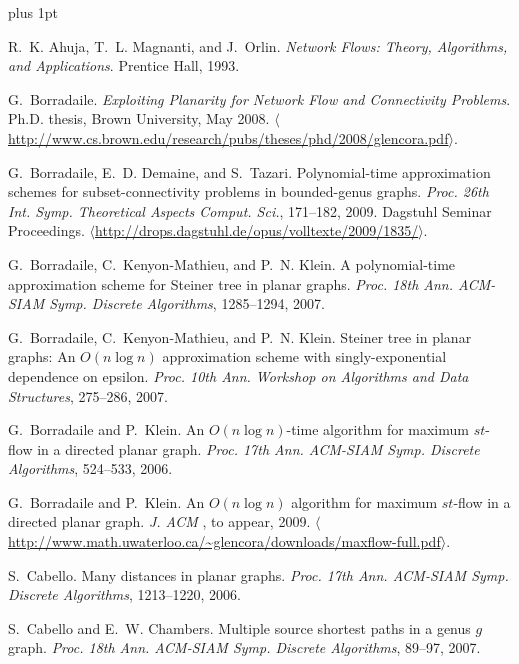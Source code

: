 \def\burl#1{$\langle$\url{#1}$\rangle$}
\begin{thebibliography}{10}
\itemsep 1pt plus 1pt

R.~K. Ahuja, T.~L. Magnanti, and J.~Orlin.
\newblock \emph{Network Flows: Theory, Algorithms, and Applications}.
\newblock Prentice Hall, 1993.

G.~Borradaile.
\newblock \emph{Exploiting Planarity for Network Flow and Connectivity
  Problems}.
\newblock Ph.D. thesis, Brown University, May 2008.
\newblock
  \burl{http://www.cs.brown.edu/research/pubs/theses/phd/2008/glencora.pdf}.

G.~Borradaile, E.~D. Demaine, and S.~Tazari.
\newblock Polynomial-time approximation schemes for subset-connectivity
  problems in bounded-genus graphs.
\newblock \emph{Proc. 26th Int. Symp. Theoretical Aspects Comput. Sci.},
  171--182, 2009. Dagstuhl Seminar Proceedings.
\newblock \burl{http://drops.dagstuhl.de/opus/volltexte/2009/1835/}.

G.~Borradaile, C.~Kenyon-Mathieu, and P.~N. Klein.
\newblock A polynomial-time approximation scheme for {Steiner} tree in planar
  graphs.
\newblock \emph{Proc. 18th Ann. ACM-SIAM Symp. Discrete Algorithms},
  1285--1294, 2007.

G.~Borradaile, C.~Kenyon-Mathieu, and P.~N. Klein.
\newblock Steiner tree in planar graphs: {An} {$O(n \log n)$} approximation
  scheme with singly-exponential dependence on epsilon.
\newblock \emph{Proc. 10th Ann. Workshop on Algorithms and Data Structures},
  275--286, 2007.

G.~Borradaile and P.~Klein.
\newblock An {$O(n \log n)$}-time algorithm for maximum $st$-flow in a directed
  planar graph.
\newblock \emph{Proc. 17th Ann. ACM-SIAM Symp. Discrete Algorithms}, 524--533,
  2006.

G.~Borradaile and P.~Klein.
\newblock An {$O(n\log n)$} algorithm for maximum $st$-flow in a directed
  planar graph.
\newblock \emph{J. ACM} $\!\!$, to appear, 2009.
\newblock
  \burl{http://www.math.uwaterloo.ca/~glencora/downloads/maxflow-full.pdf}.

S.~Cabello.
\newblock Many distances in planar graphs.
\newblock \emph{Proc. 17th Ann. ACM-SIAM Symp. Discrete Algorithms},
  1213--1220, 2006.

S.~Cabello and E.~W. Chambers.
\newblock Multiple source shortest paths in a genus $g$ graph.
\newblock \emph{Proc. 18th Ann. ACM-SIAM Symp. Discrete Algorithms}, 89--97,
  2007.


\end{thebibliography}
